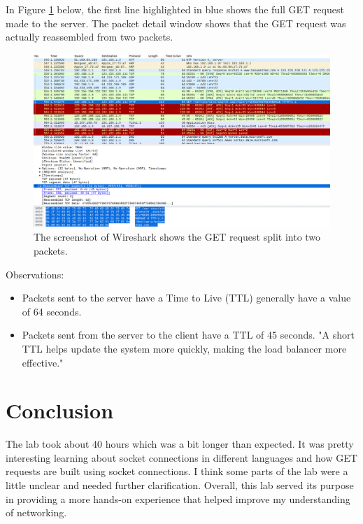 \documentclass[11pt]{article}
\begin{document}
In Figure \ref{fig:full-split-get-request} below, the first line highlighted in blue shows the full GET request made to the server.
The packet detail window shows that the GET request was actually reassembled from two packets.
\begin{figure}[htbp]
  \centering
  \includegraphics[width=.9\linewidth]{./full-split-get-request.png}
  \caption{\label{fig:full-split-get-request}
  The screenshot of Wireshark shows the GET request split into two packets.}
\end{figure}

\noindent Observations:
\begin{itemize}
  \item Packets sent to the server have a Time to Live (TTL) generally have a value of 64 seconds.
  \item Packets sent from the server to the client have a TTL of 45 seconds.
  "A short TTL helps update the system more quickly, making the load balancer more effective."~\cite{ttl}
\end{itemize}

\section*{Conclusion}
\label{sec:conclusion}
The lab took about 40 hours which was a bit longer than expected.
It was pretty interesting learning about socket connections in different languages and how GET requests are built using socket connections.
I think some parts of the lab were a little unclear and needed further clarification.
Overall, this lab served its purpose in providing a more hands-on experience that helped improve my understanding of networking.

\nocite{*}


\end{document}
